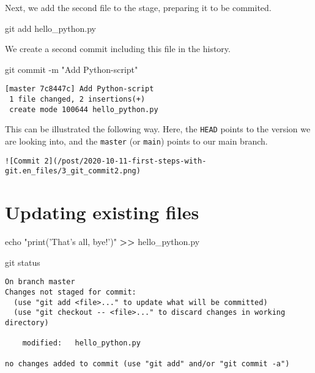 \documentclass[]{article}
\newenvironment{Shaded}{\begin{snugshade}}{\end{snugshade}}
\newcommand{\BuiltInTok}[1]{#1}
\newcommand{\FunctionTok}[1]{\textcolor[rgb]{0.00,0.00,0.00}{#1}}
\newcommand{\NormalTok}[1]{#1}
\newcommand{\OperatorTok}[1]{\textcolor[rgb]{0.81,0.36,0.00}{\textbf{#1}}}
\newcommand{\StringTok}[1]{\textcolor[rgb]{0.31,0.60,0.02}{#1}}
\begin{document}
Next, we add the second file to the stage, preparing it to be commited.

\begin{Shaded}
\begin{Highlighting}[]
\FunctionTok{git}\NormalTok{ add hello_python.py}
\end{Highlighting}
\end{Shaded}

We create a second commit including this file in the history.

\begin{Shaded}
\begin{Highlighting}[]
\FunctionTok{git}\NormalTok{ commit -m }\StringTok{"Add Python-script"}
\end{Highlighting}
\end{Shaded}

\begin{verbatim}
[master 7c8447c] Add Python-script
 1 file changed, 2 insertions(+)
 create mode 100644 hello_python.py
\end{verbatim}

This can be illustrated the following way. Here, the \texttt{HEAD}
points to the version we are looking into, and the \texttt{master} (or
\texttt{main}) points to our main branch.

\begin{verbatim}
![Commit 2](/post/2020-10-11-first-steps-with-git.en_files/3_git_commit2.png)
\end{verbatim}

\hypertarget{updating-existing-files}{%
\section{Updating existing files}\label{updating-existing-files}}

\begin{Shaded}
\begin{Highlighting}[]
\BuiltInTok{echo} \StringTok{"print('That's all, bye!')"} \OperatorTok{>>}\NormalTok{ hello_python.py}
\end{Highlighting}
\end{Shaded}

\begin{Shaded}
\begin{Highlighting}[]
\FunctionTok{git}\NormalTok{ status}
\end{Highlighting}
\end{Shaded}

\begin{verbatim}
On branch master
Changes not staged for commit:
  (use "git add <file>..." to update what will be committed)
  (use "git checkout -- <file>..." to discard changes in working directory)

    modified:   hello_python.py

no changes added to commit (use "git add" and/or "git commit -a")
\end{verbatim}
\end{document}
